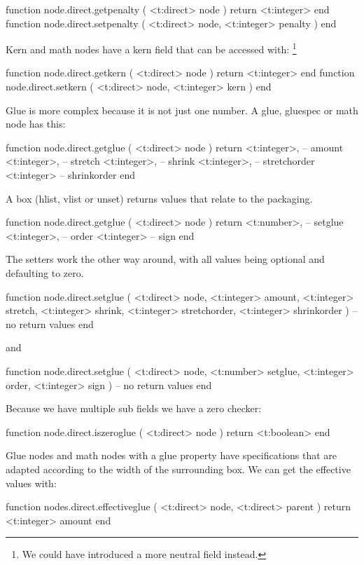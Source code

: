 \starttyping[option=LUA]
function node.direct.getpenalty ( <t:direct> node ) return <t:integer> end
function node.direct.setpenalty ( <t:direct> node, <t:integer> penalty ) end
\stoptyping

Kern and math nodes have a kern field that can be accessed with: \footnote {We
could have introduced a more neutral  field instead.}

\starttyping[option=LUA]
function node.direct.getkern ( <t:direct> node ) return <t:integer> end
function node.direct.setkern ( <t:direct> node, <t:integer> kern ) end
\stoptyping

Glue is more complex because it is not just one number. A glue, gluespec or math
node has this:

\starttyping[option=LUA]
function node.direct.getglue ( <t:direct> node )
    return
        <t:integer>, -- amount
        <t:integer>, -- stretch
        <t:integer>, -- shrink
        <t:integer>, -- stretchorder
        <t:integer>  -- shrinkorder
end
\stoptyping

A box (hlist, vlist or unset) returns values that relate to the packaging.

\starttyping[option=LUA]
function node.direct.getglue ( <t:direct> node )
    return
        <t:number>,  -- setglue
        <t:integer>, -- order
        <t:integer>  -- sign
end
\stoptyping

The setters work the other way around, with all values being optional and
defaulting to zero.

\starttyping[option=LUA]
function node.direct.setglue (
    <t:direct>  node,
    <t:integer> amount,
    <t:integer> stretch,
    <t:integer> shrink,
    <t:integer> stretchorder,
    <t:integer> shrinkorder
)
   -- no return values
end
\stoptyping

and

\starttyping[option=LUA]
function node.direct.setglue (
    <t:direct>  node,
    <t:number>  setglue,
    <t:integer> order,
    <t:integer> sign
)
   -- no return values
end
\stoptyping

Because we have multiple sub fields we have a zero checker:

\starttyping[option=LUA]
function node.direct.iszeroglue ( <t:direct> node ) return <t:boolean> end
\stoptyping

Glue nodes and math nodes with a glue property have specifications that
are adapted according to the width of the surrounding box. We can get the
effective values with:

\starttyping[option=LUA]
function nodes.direct.effectiveglue (
    <t:direct> node,
    <t:direct> parent
)
    return <t:integer> amount
end
\stoptyping

